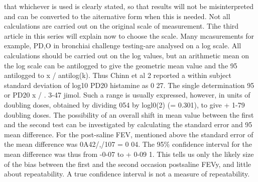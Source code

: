 \documentclass{article}
\begin{document}
that whichever is used is clearly stated, so that
results will not be misinterpreted and can be
converted to the aiternative form when this is
needed.
\newpage
Not all calculations are carried out on the
original scale of measurement. Tihe third
article in this series will explain now to choose
the scale. Many mcasurements for example,
PD,O in bronchiai challenge testing-are
analysed on a log scale. All calculations should
be carried out on the log values, but an
arithmetic mean on the log scale can be
antilogged to give the geometric mean value
and the 95%
antilogged to x / antilog(k). Thus Chinn et
al 2 reported a within subject standard deviation
of log10 PD20 histamine as 0 27. The
single determination 95%
or PD20 x / . 3-47 jimol. Such a range
is usually expressed, however, in units of
doubling doses, obtained by dividing 054 by
logl0(2) (= 0.301), to give + 1-79 doubling
doses.
The possibility of an overall shift in mean
value between the first and the second test can
be investigated by calculating the standard
error and 95%
mean difference. For the post-saline FEV,
mentioned above the standard error of the
mean difference was 0A42/,/107 = 0 04. The
95\% confidence interval for the mean difference
was thus from -0-07 to + 0-09 1.
This tells us only the likely size of the bias
between the first and the second occasion postsaline
FEVy, and little about repeatability. A
true confidence interval is not a measure of
repeatability.
\end{document}
